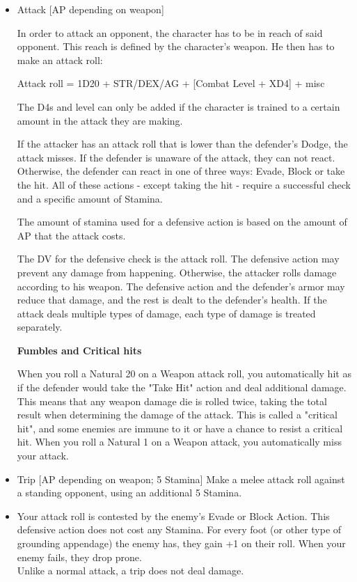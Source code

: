 \begin{itemize}

\item Attack [AP depending on weapon]

In order to attack an opponent, the character has to be in reach of said opponent.
This reach is defined by the character's weapon.
He then has to make an attack roll:

Attack roll = 1D20 + STR/DEX/AG + [Combat Level + XD4] + misc

The D4s and level can only be added if the character is trained to a certain amount in the attack they are making.

If the attacker has an attack roll that is lower than the defender's Dodge, the attack misses.
If the defender is unaware of the attack, they can not react.
Otherwise, the defender can react in one of three ways: Evade, Block or take the hit.
All of these actions - except taking the hit - require a successful check and a specific amount of Stamina.

The amount of stamina used for a defensive action is based on the amount of  AP that the attack costs.

The DV for the defensive check is the attack roll.
The defensive action may prevent any damage from happening.
Otherwise, the attacker rolls damage according to his weapon.
The defensive action and the defender's armor may reduce that damage, and the rest is dealt to the defender's health.
If the attack deals multiple types of damage, each type of damage is treated separately.


\textbf{Fumbles and Critical hits}

When you roll a Natural 20 on a Weapon attack roll, you automatically hit as if the defender would take the "Take Hit" action and deal additional damage.
This means that any weapon damage die is rolled twice, taking the total result when determining the damage of the attack.
This is called a "critical hit", and some enemies are immune to it or have a chance to resist a critical hit.
When you roll a Natural 1 on a Weapon attack, you automatically miss your attack.


\item Trip [AP depending on weapon; 5 Stamina]
Make a melee attack roll against a standing opponent, using an additional 5 Stamina.


\item Your attack roll is contested by the enemy's Evade or Block Action.
This defensive action does not cost any Stamina.
For every foot (or other type of grounding appendage) the enemy has, they gain +1 on their roll.
When your enemy fails, they drop prone.\\
Unlike a normal attack, a trip does not deal damage.\\



\end{itemize}
